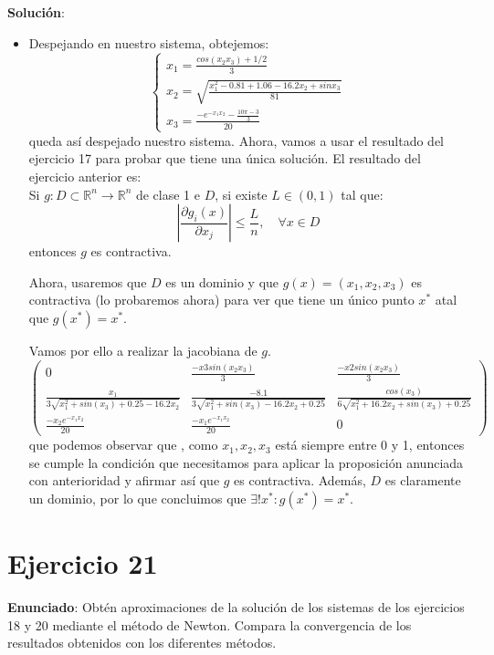 \documentclass[11pt]{article}
\begin{document}
\textbf{Solución}:

\begin{itemize}
	\item Despejando en nuestro sistema, obtejemos:
	\[
	\begin{cases}
	x_1 = \frac{cos(x_2x_3) + 1/2}{3}\\
 x_2 = \sqrt{\frac{x_1^2 -0.81+1.06-16.2x_2+sinx_3}{81}}\\
  x_3 = \frac{-e^{-x_1x_2}- \frac{10\pi-3}{3}}{20}
\end{cases}
	\]
	queda así despejado nuestro sistema.
	Ahora, vamos a usar el resultado del ejercicio 17 para probar que tiene una única solución.
	El resultado del ejercicio anterior es:\\
	Si $g:D\subset \mathbb R^n \to \mathbb R^n$ de clase 1 e $D$, si existe $L \in (0,1)$ tal que:
	\[
	|\dfrac{\partial g_i(x)}{\partial x_j}| \leq \dfrac{L}{n}, \quad \forall x \in D
	\]
	entonces $g$ es contractiva.
	
	Ahora, usaremos que $D$ es un dominio y que $g(x) = (x_1,x_2,x_3)$ es contractiva (lo probaremos ahora) para ver que tiene un único punto $x^*$ atal que $g(x^*) = x^*$.
	
	Vamos por ello a realizar la jacobiana de $g$.
\[	\begin{pmatrix}
    0 & \frac{-x3 sin(x_2x_3)}{3} & \frac{-x2 sin(x_2x_3)}{3}\\
    \frac{x_1}{3\sqrt{x_1^2 + sin(x_3)+0.25-16.2x_2}}& \frac{-8.1}{3\sqrt{x_1^2+ sin(x_3)-16.2x_2+0.25}} & \frac{cos(x_3)}{6\sqrt{x_1^2+16.2x_2+sin(x_3)+0.25}} \\
    \frac{-x_2e^{-x_1x_2}}{20} & 
    \frac{-x_1e^{-x_1x_2}}{20} & 0
  \end{pmatrix}
 \]
 que podemos observar que , como $x_1,x_2,x_3$ está siempre entre 0 y 1, entonces se cumple la condición que necesitamos para aplicar la proposición anunciada con anterioridad y afirmar así que $g$ es contractiva. Además, $D$ es claramente un dominio, por lo que concluimos que $\exists ! x^* : g(x^*) = x^*$.
\end{itemize}

\section{Ejercicio 21}
\textbf{Enunciado}: Obtén aproximaciones de la solución de los sistemas de los ejercicios 18 y 20 mediante el método de Newton. Compara la convergencia de los resultados obtenidos con los diferentes métodos.
\end{document}
